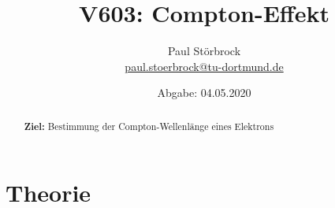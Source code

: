 


    \title{V603: Compton-Effekt}
    \author{  
    Paul Störbrock\\
    \texorpdfstring{\href{mailto:paul.stoerbrock@tu-dortmund.de}{paul.stoerbrock@tu-dortmund.de}}{}
    }
    \date{Abgabe: 04.05.2020\vspace{-4ex}}
\maketitle
    
    \begin{abstract}
    \centering
        \textbf{Ziel:} Bestimmung der Compton-Wellenlänge eines Elektrons
    \end{abstract}

\newpage
\tableofcontents
\newpage

\setcounter{page}{1}

\section{Theorie}

